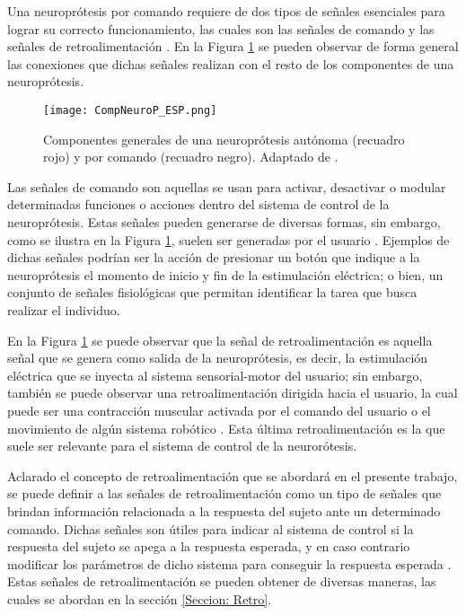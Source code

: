 Una neuroprótesis por comando requiere de dos tipos de señales esenciales para lograr su correcto funcionamiento, las cuales son las señales de comando y las señales de retroalimentación \cite{Popovic2015}. En la Figura \ref{Figura: CompNeuroP} se pueden observar de forma general las conexiones que dichas señales realizan con el resto de los componentes de una neuroprótesis.

\begin{figure}[htbp]
\centering
	\texttt{[image: CompNeuroP\_ESP.png]}
	\caption[Componentes generales de una neuroprótesis]{Componentes generales de una neuroprótesis autónoma (recuadro rojo) y por comando (recuadro negro). Adaptado de \cite{Popovic2015}.}
	\label{Figura: CompNeuroP}
\end{figure}

Las señales de comando son aquellas se usan para activar, desactivar o modular determinadas funciones o acciones dentro del sistema de control de la neuroprótesis. Estas señales pueden generarse de diversas formas, sin embargo, como se ilustra en la Figura \ref{Figura: CompNeuroP}, suelen ser generadas por el usuario \cite{Popovic2015}. Ejemplos de dichas señales podrían ser la acción de presionar un botón que indique a la neuroprótesis el momento de inicio y fin de la estimulación eléctrica; o bien, un conjunto de señales fisiológicas que permitan identificar la tarea que busca realizar el individuo.

En la Figura \ref{Figura: CompNeuroP} se puede observar que la señal de retroalimentación es aquella señal que se genera como salida de la neuroprótesis, es decir, la estimulación eléctrica que se inyecta al sistema sensorial-motor del usuario; sin embargo, también se puede observar una retroalimentación dirigida hacia el usuario, la cual puede ser una contracción muscular activada por el comando del usuario o el movimiento de algún sistema robótico \cite{Popovic2015}. Esta última retroalimentación es la que suele ser relevante para el sistema de control de la neurorótesis.

Aclarado el concepto de retroalimentación que se abordará en el presente trabajo, se puede definir a las señales de retroalimentación como un tipo de señales que brindan información relacionada a la respuesta del sujeto ante un determinado comando. Dichas señales son útiles para indicar al sistema de control si la respuesta del sujeto se apega a la respuesta esperada, y en caso contrario modificar los parámetros de dicho sistema para conseguir la respuesta esperada \cite{Wright2016}. Estas señales de retroalimentación se pueden obtener de diversas maneras, las cuales se abordan en la sección \ref{Seccion: Retro}.

